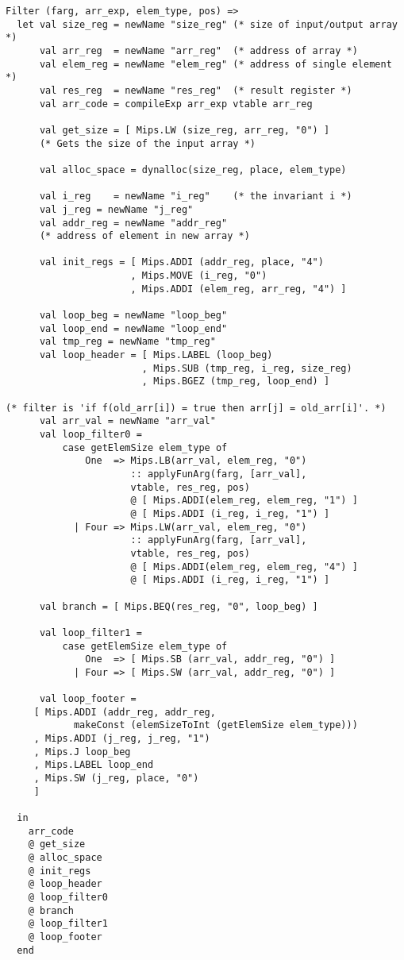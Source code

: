 \documentclass[12pt]{article}
\begin{document}
\begin{verbatim}
Filter (farg, arr_exp, elem_type, pos) =>
  let val size_reg = newName "size_reg" (* size of input/output array *)
      val arr_reg  = newName "arr_reg"  (* address of array *)
      val elem_reg = newName "elem_reg" (* address of single element *)
      val res_reg  = newName "res_reg"  (* result register *)
      val arr_code = compileExp arr_exp vtable arr_reg

      val get_size = [ Mips.LW (size_reg, arr_reg, "0") ] 
      (* Gets the size of the input array *)
      
      val alloc_space = dynalloc(size_reg, place, elem_type)

      val i_reg    = newName "i_reg"    (* the invariant i *)
      val j_reg = newName "j_reg"
      val addr_reg = newName "addr_reg" 
      (* address of element in new array *)

      val init_regs = [ Mips.ADDI (addr_reg, place, "4")
                      , Mips.MOVE (i_reg, "0")
                      , Mips.ADDI (elem_reg, arr_reg, "4") ]

      val loop_beg = newName "loop_beg"
      val loop_end = newName "loop_end"
      val tmp_reg = newName "tmp_reg"
      val loop_header = [ Mips.LABEL (loop_beg)
                        , Mips.SUB (tmp_reg, i_reg, size_reg)
                        , Mips.BGEZ (tmp_reg, loop_end) ]

(* filter is 'if f(old_arr[i]) = true then arr[j] = old_arr[i]'. *)
      val arr_val = newName "arr_val"
      val loop_filter0 =
          case getElemSize elem_type of
              One  => Mips.LB(arr_val, elem_reg, "0")
                      :: applyFunArg(farg, [arr_val], 
                      vtable, res_reg, pos)
                      @ [ Mips.ADDI(elem_reg, elem_reg, "1") ]
                      @ [ Mips.ADDI (i_reg, i_reg, "1") ]
            | Four => Mips.LW(arr_val, elem_reg, "0")
                      :: applyFunArg(farg, [arr_val], 
                      vtable, res_reg, pos)
                      @ [ Mips.ADDI(elem_reg, elem_reg, "4") ]
                      @ [ Mips.ADDI (i_reg, i_reg, "1") ]

      val branch = [ Mips.BEQ(res_reg, "0", loop_beg) ]

      val loop_filter1 =
          case getElemSize elem_type of
              One  => [ Mips.SB (arr_val, addr_reg, "0") ]
            | Four => [ Mips.SW (arr_val, addr_reg, "0") ]

      val loop_footer =
     [ Mips.ADDI (addr_reg, addr_reg,
            makeConst (elemSizeToInt (getElemSize elem_type)))
     , Mips.ADDI (j_reg, j_reg, "1")
     , Mips.J loop_beg
     , Mips.LABEL loop_end
     , Mips.SW (j_reg, place, "0")
     ]

  in
    arr_code
    @ get_size
    @ alloc_space
    @ init_regs
    @ loop_header
    @ loop_filter0
    @ branch
    @ loop_filter1
    @ loop_footer
  end
\end{verbatim}
\hfill
\hfill
\end{document}
